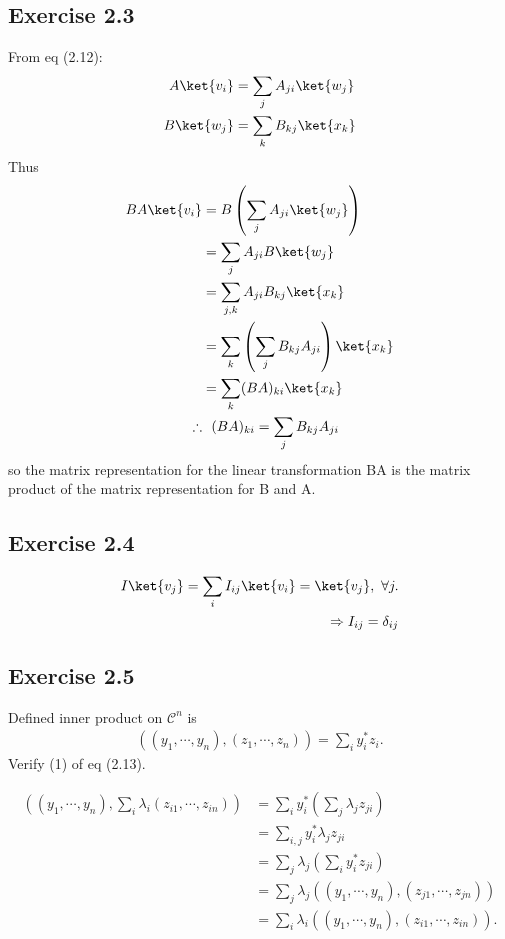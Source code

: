 \documentclass[a4paper,12pt]{article}
\begin{document}
\subsection*{Exercise 2.3}
From eq (2.12):
\begin{align*}
	A \ket{v_i} &= \sum_{j} A_{ji}\ket{w_j}\\
	B \ket{w_j} &= \sum_{k} B_{kj}\ket{x_k}
\end{align*}
%
Thus
\begin{align*}
	BA \ket{v_i} &= B \left( \sum_{j} A_{ji}\ket{w_j} \right)\\
	&= \sum_{j} A_{ji} B\ket{w_j}\\
	&= \sum_{j,k} A_{ji} B_{kj}\ket{x_k}\\
	&= \sum_k \left( \sum_j B_{kj} A_{ji}  \right) \ket{x_k}\\
	&= \sum_k (BA)_{ki} \ket{x_k}\\
	\therefore& \ \ (BA)_{ki} = \sum_j B_{kj} A_{ji}
\end{align*}
so the matrix representation for the linear transformation BA is the matrix product of the matrix representation for B and A.



\subsection*{Exercise 2.4}
\begin{align*}
	I\ket{v_j} = \sum_i I_{ij} \ket{v_i} = \ket{v_j},\ \forall j.\\
	\Rightarrow I_{ij} = \delta_{ij}
\end{align*}


\subsection*{Exercise 2.5}
Defined inner product on $\mathcal{C}^n$ is
\begin{align*}
	\left(
		(y_1, \cdots, y_n), (z_1, \cdots, z_n)
	\right)
	= \sum_{i} y_i^* z_i .
\end{align*}
Verify (1) of eq (2.13).

\begin{align*}
	\left(
		(y_1, \cdots, y_n), \sum_i \lambda_i (z_{i1}, \cdots, z_{in})
	\right)
	&= \sum_i y_i^* \left(
										\sum_j \lambda_j z_{ji}
			      				   \right)\\
	&= \sum_{i,j} y_i^* \lambda_j z_{ji}\\
	&= \sum_j \lambda_j \left(\sum_i y_i^* z_{ji}  \right)\\
	&= \sum_j \lambda_j \left(
													(y_1, \cdots, y_n),  (z_{j1}, \cdots, z_{jn})
											  \right)\\
	&= \sum_i \lambda_i \left(
													(y_1, \cdots, y_n),  (z_{i1}, \cdots, z_{in})
												\right).
\end{align*}
\end{document}
